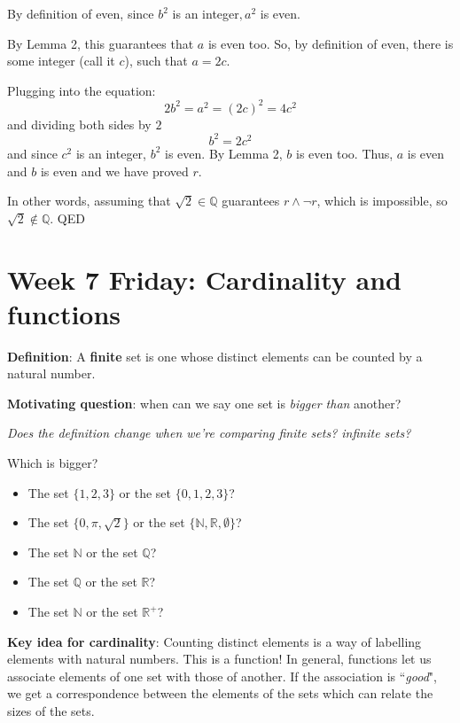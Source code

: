 \documentclass[12pt, oneside]{article}
\begin{document}
By definition of even, since $b^2$ is an integer$, a^2$ is even.

By Lemma 2, this guarantees that $a$ is even too. So, by 
definition of even, there is some integer (call it $c$), such that $a = 2c$.

Plugging into the equation:
\[
    2b^2 = a^2 = (2c)^2 = 4c^2
\]
and dividing both sides by $2$
\[
    b^2 = 2c^2
\]
and since $c^2$ is an integer, $b^2$ is even. By Lemma 2, $b$ is even too.
Thus, $a$ is even and $b$ is even and we have proved $r$. 

In other words, assuming that $\sqrt{2} \in \mathbb{Q}$ guarantees $r \land \lnot r$, 
which is impossible, so $\sqrt{2} \notin \mathbb{Q}$. QED

 
\newpage

\section*{Week 7 Friday: Cardinality and functions}



{\bf Definition}: A {\bf finite} set is one whose distinct elements can be counted by a natural number.
 

{\bf Motivating question}: when can we say one set is {\it bigger than} another?

{\it Does the definition change when we're comparing finite sets? infinite sets?}

Which is bigger? 
\begin{itemize}
    \item The set $\{1,2,3\}$ or the set $\{0,1,2,3\}$?
    \item The set $\{0, \pi, \sqrt{2} \}$ or the set $\{\mathbb{N}, \mathbb{R}, \emptyset\}$?
    \item The set $\mathbb{N}$ or the set $\mathbb{Q}$?
    \item The set $\mathbb{Q}$ or the set $\mathbb{R}$?
    \item The set $\mathbb{N}$ or the set $\mathbb{R}^+$?
\end{itemize}

 

{\bf Key idea for cardinality}: Counting 
distinct elements is a way of labelling elements
with natural numbers. This is a function!
In general, functions let us 
associate elements of one set with those
of another. If the association is ``{\it good}", 
we get a correspondence between the elements of the sets
which can relate the sizes of the sets. 
\end{document}

